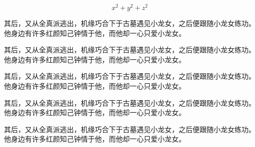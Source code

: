 \documentclass[doctor, vlined]{DissertUESTC}
\begin{document}
\begin{longtable}{p{2em} p{4.5em}}
	\end{longtable}
	

	\begin{equation}
		x^2 + y^2 + z^2
	\end{equation}
	


	\begin{definition}[名称]
		其后，又从全真派逃出，机缘巧合下于古墓遇见小龙女，之后便跟随小龙女练功。他身边有许多红颜知己钟情于他，而他却一心只爱小龙女。
	\end{definition}

	\begin{axiom}[名称]
		其后，又从全真派逃出，机缘巧合下于古墓遇见小龙女，之后便跟随小龙女练功。他身边有许多红颜知己钟情于他，而他却一心只爱小龙女。
	\end{axiom}
	
	\begin{theorem}[名称]
		其后，又从全真派逃出，机缘巧合下于古墓遇见小龙女，之后便跟随小龙女练功。他身边有许多红颜知己钟情于他，而他却一心只爱小龙女。
	\end{theorem}
	
	\begin{proposition}[名称]
		其后，又从全真派逃出，机缘巧合下于古墓遇见小龙女，之后便跟随小龙女练功。他身边有许多红颜知己钟情于他，而他却一心只爱小龙女。
	\end{proposition}
	
	\begin{corollary}[名称]
		其后，又从全真派逃出，机缘巧合下于古墓遇见小龙女，之后便跟随小龙女练功。他身边有许多红颜知己钟情于他，而他却一心只爱小龙女。
	\end{corollary}
	
\end{document}
